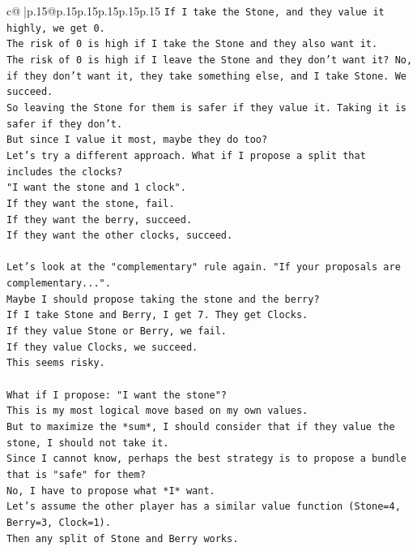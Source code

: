 \documentclass{article}
\begin{document}
{\begin{supertabular}{c@{$\;$}|p{.15\linewidth}@{}p{.15\linewidth}p{.15\linewidth}p{.15\linewidth}p{.15\linewidth}p{.15\linewidth}}
{{{\texttt{If I take the Stone, and they value it highly, we get 0.} \\
\texttt{The risk of 0 is high if I take the Stone and they also want it.} \\
\texttt{The risk of 0 is high if I leave the Stone and they don't want it? No, if they don't want it, they take something else, and I take Stone. We succeed.} \\
\texttt{So leaving the Stone for them is safer if they value it. Taking it is safer if they don't.} \\
\texttt{But since I value it most, maybe they do too?} \\
\texttt{Let's try a different approach. What if I propose a split that includes the clocks?} \\
\texttt{"I want the stone and 1 clock".} \\
\texttt{If they want the stone, fail.} \\
\texttt{If they want the berry, succeed.} \\
\texttt{If they want the other clocks, succeed.} \\
\\ 
\texttt{Let's look at the "complementary" rule again. "If your proposals are complementary...".} \\
\texttt{Maybe I should propose taking the stone and the berry?} \\
\texttt{If I take Stone and Berry, I get 7. They get Clocks.} \\
\texttt{If they value Stone or Berry, we fail.} \\
\texttt{If they value Clocks, we succeed.} \\
\texttt{This seems risky.} \\
\\ 
\texttt{What if I propose: "I want the stone"?} \\
\texttt{This is my most logical move based on my own values.} \\
\texttt{But to maximize the *sum*, I should consider that if they value the stone, I should not take it.} \\
\texttt{Since I cannot know, perhaps the best strategy is to propose a bundle that is "safe" for them?} \\
\texttt{No, I have to propose what *I* want.} \\
\texttt{Let's assume the other player has a similar value function (Stone=4, Berry=3, Clock=1).} \\
\texttt{Then any split of Stone and Berry works.} \\
}}}
\end{supertabular}}
\end{document}
